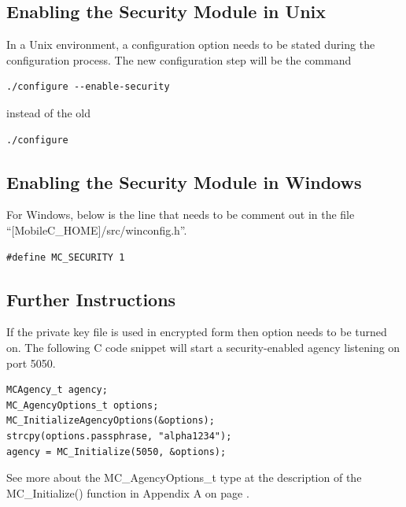 \documentclass[11pt]{report}
\begin{document}
\subsection{Enabling the Security Module in Unix}
In a Unix environment, a configuration option needs to be stated during
the configuration process. The new configuration step will be the command
\begin{verbatim}
./configure --enable-security
\end{verbatim}
instead of the old
\begin{verbatim}
./configure
\end{verbatim}


\subsection{Enabling the Security Module in Windows}
For Windows, below is the line that needs to be comment out in the 
file ``[MobileC\_HOME]/src/winconfig.h''.
\begin{verbatim}
#define MC_SECURITY 1
\end{verbatim}

\subsection{Further Instructions}
If the private key file is used in encrypted form then option needs to 
be turned on. 
The following C code snippet will start a security-enabled agency 
  listening on port 5050.
\begin{verbatim}
MCAgency_t agency;
MC_AgencyOptions_t options;
MC_InitializeAgencyOptions(&options);
strcpy(options.passphrase, "alpha1234");
agency = MC_Initialize(5050, &options);

\end{verbatim}

See more about the MC\_AgencyOptions\_t type at the description of the
  MC\_Initialize() function in Appendix A on page \pageref{api:MC_Initialize}.

\end{document}
